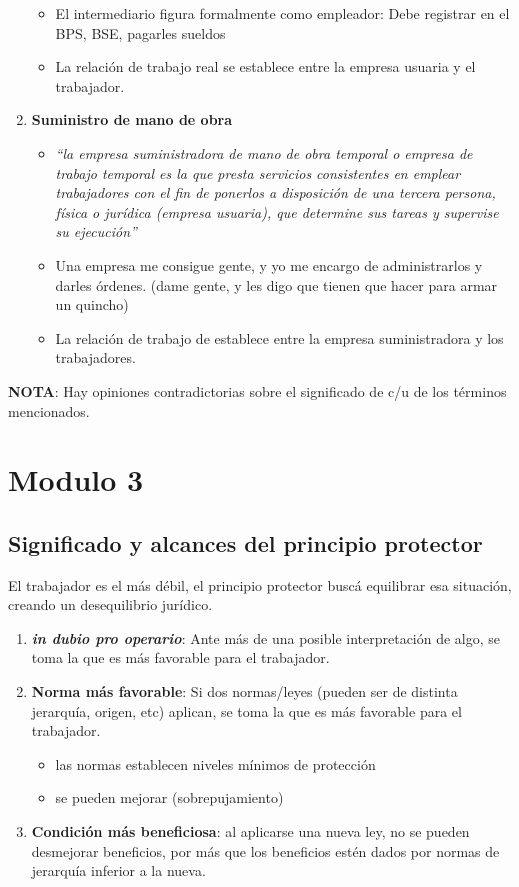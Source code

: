 \documentclass[spanish,12pt,a4paper,titlepage]{report}
\begin{document}
\begin{enumerate}
\begin{itemize}
  \item El intermediario figura formalmente como empleador: Debe registrar en el BPS, BSE, pagarles sueldos
  \item La relación de trabajo real se establece entre la empresa usuaria y el trabajador.
  \end{itemize}
\item \textbf{Suministro de mano de obra}
  \begin{itemize}
\item \textit{``la empresa suministradora de mano de obra temporal o empresa de trabajo temporal es la que presta servicios consistentes en emplear trabajadores con el fin de ponerlos a disposición de una tercera persona, física o jurídica (empresa usuaria), que determine sus tareas y supervise su ejecución''}
  \item Una empresa me consigue gente, y yo me encargo de administrarlos y darles órdenes. (dame gente, y les digo que tienen que hacer para armar un quincho)
  \item La relación de trabajo de establece entre la empresa suministradora y los trabajadores.
  \end{itemize}
\end{enumerate}

\textbf{NOTA}: Hay opiniones contradictorias sobre el significado de c/u de los términos mencionados.

\section{Modulo 3}

\subsection{Significado y alcances del principio protector}

El trabajador es el más débil, el principio protector buscá equilibrar esa situación, creando un desequilibrio jurídico.

\begin{enumerate}
\item \textbf{\textit{in dubio pro operario}}: Ante más de una posible interpretación de algo, se toma la que es más favorable para el trabajador.
\item \textbf{Norma más favorable}: Si dos normas/leyes (pueden ser de distinta jerarquía, origen, etc) aplican, se toma la que es más favorable para el trabajador.
  \begin{itemize}
  \item las normas establecen niveles mínimos de protección
  \item se pueden mejorar (sobrepujamiento)
  \end{itemize}
\item \textbf{Condición más beneficiosa}: al aplicarse una nueva ley, no se pueden desmejorar beneficios, por más que los beneficios estén dados por normas de jerarquía inferior a la nueva.
\end{enumerate}
\end{document}
